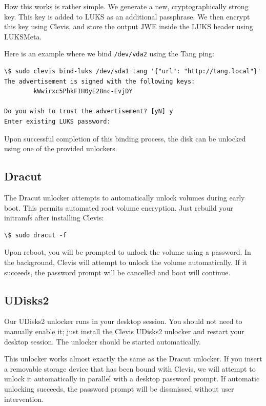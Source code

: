 How this works is rather simple. We generate a new, cryptographically strong key. This key is added to LUKS as an additional passphrase. We then encrypt this key using Clevis, and store the output JWE inside the LUKS header using LUKSMeta.

Here is an example where we bind {\tt /dev/vda2} using the Tang ping:
\begin{lstlisting}[columns=fixed,tabsize=4,backgroundcolor=\color{yellow!10}]
\$ sudo clevis bind-luks /dev/sda1 tang '{"url": "http://tang.local"}'
The advertisement is signed with the following keys:
        kWwirxc5PhkFIH0yE28nc-EvjDY

Do you wish to trust the advertisement? [yN] y
Enter existing LUKS password:
\end{lstlisting}

Upon successful completion of this binding process, the disk can be unlocked using one of the provided unlockers.

\subsection{Dracut}\label{dracut}
The Dracut unlocker attempts to automatically unlock volumes during early boot.
This permits automated root volume encryption.
Just rebuild your initramfs after installing Clevis:

\begin{lstlisting}[columns=fixed,tabsize=4,backgroundcolor=\color{yellow!10}]
\$ sudo dracut -f
\end{lstlisting}

Upon reboot, you will be prompted to unlock the volume using a password. In the background, Clevis will attempt to unlock the volume automatically. If it succeeds, the password prompt will be cancelled and boot will continue.

\subsection{UDisks2}\label{udisk2}
Our UDisks2 unlocker runs in your desktop session.
You should not need to manually enable it; just install the Clevis UDisks2 unlocker and restart your desktop session.
The unlocker should be started automatically.

This unlocker works almost exactly the same as the Dracut unlocker.
If you insert a removable storage device that has been bound with Clevis, we will attempt to unlock it automatically in parallel with a desktop password prompt.
If automatic unlocking succeeds, the password prompt will be dissmissed without user intervention.
